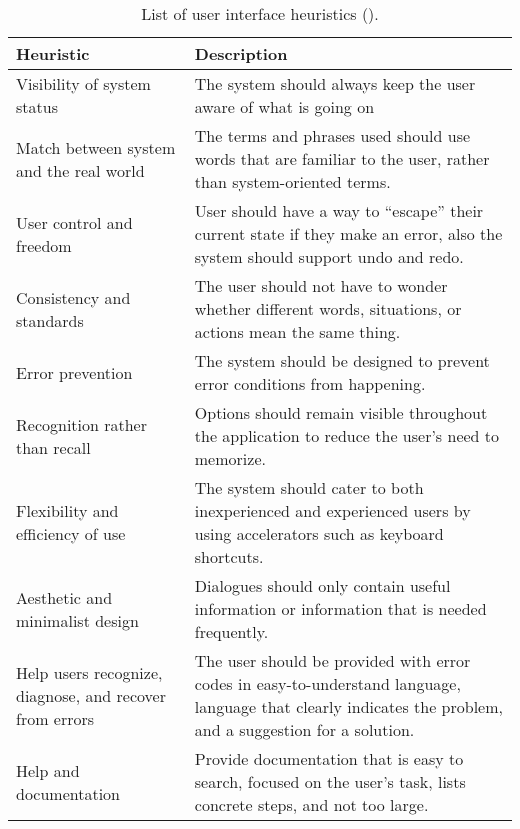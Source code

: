 \begin{doublespace}
\begin{singlespace}
\begin{table}[H]
    \caption{List of user interface heuristics (\cite{nielsen_10_1994}).}
    \label{tab:heuristics}
    \begin{tabularx}{1\textwidth}{||Y|Y||}
    \hline
    \textbf{Heuristic} & \textbf{Description} \\ \hline \hline
    Visibility of system status & The system should always keep the user aware of what is going on \\ \hline
    Match between system and the real world & The terms and phrases used should use words that are familiar to the user, rather than system-oriented terms. \\ \hline
    User control and freedom & User should have a way to ``escape'' their current state if they make an error, also the system should support undo and redo. \\ \hline
    Consistency and standards & The user should not have to wonder whether different words, situations, or actions mean the same thing. \\ \hline
    Error prevention & The system should be designed to prevent error conditions from happening. \\ \hline
    Recognition rather than recall & Options should remain visible throughout the application to reduce the user's need to memorize. \\ \hline 
    Flexibility and efficiency of use & The system should cater to both inexperienced and experienced users by using accelerators such as keyboard shortcuts. \\ \hline
    Aesthetic and minimalist design & Dialogues should only contain useful information or information that is needed frequently. \\ \hline
    Help users recognize, diagnose, and recover from errors & The user should be provided with error codes in easy-to-understand language, language that clearly indicates the problem, and a suggestion for a solution. \\ \hline 
    Help and documentation & Provide documentation that is easy to search, focused on the user's task, lists concrete steps, and not too large. \\
    \hline 
    \end{tabularx}
\end{table}
\end{singlespace}


\end{doublespace}
